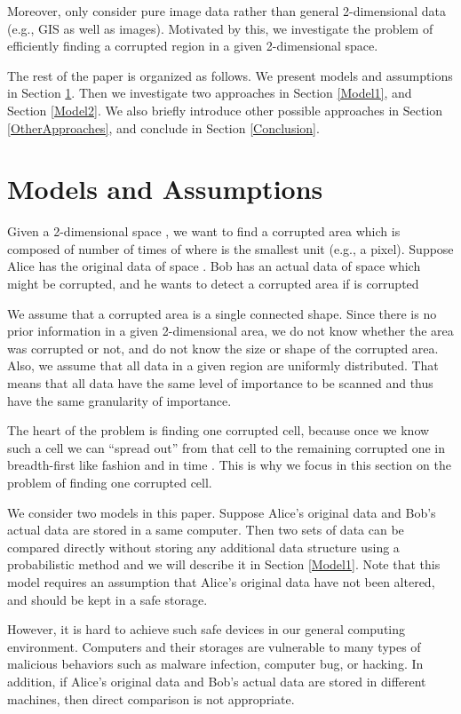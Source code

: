 \documentclass{llncs}
\begin{document}
Moreover, \cite{ZaMu07} only consider pure image data 
rather than general 2-dimensional data (e.g., GIS as well as images). 
Motivated by this, we investigate the problem of efficiently finding a corrupted region
in a given 2-dimensional space.

The rest of the paper is organized as follows. 
We present models and assumptions in Section \ref{ModelsAndAssumptions}.
Then we investigate two approaches in Section \ref{Model1}, 
and Section \ref{Model2}.
We also briefly introduce other possible approaches in Section \ref{OtherApproaches},
and conclude in Section \ref{Conclusion}.

\section{Models and Assumptions}
\label{ModelsAndAssumptions}
Given a 2-dimensional space , we want to find a corrupted area 
which is composed of  number of times of  where  is the smallest unit (e.g., a pixel).
Suppose Alice has the original data of space .
Bob has an actual data of space  which might be corrupted,
and he wants to detect a corrupted area  if  is corrupted 

We assume that a corrupted area is a single connected shape.
Since there is no prior information in a given 2-dimensional area,
we do not know whether the area was corrupted or not, and   
do not know the size or shape of the corrupted area.
Also, we assume that all data in a given region are uniformly distributed.
That means that all data have the same level of importance to be scanned 
and thus have the same granularity of importance.

The heart of the problem
is finding one corrupted cell, because once we
know such a cell we can ``spread out'' from that cell 
to the remaining corrupted one in breadth-first like fashion
and in time .
This is why we focus in this section on the problem of
finding one corrupted cell.

We consider two models in this paper. 
Suppose Alice's original data and Bob's actual data are stored in a same computer.
Then two sets of data can be compared directly without storing any additional data structure
using a probabilistic method and we will describe it in Section \ref{Model1}.
Note that this model requires an assumption that Alice's original data have not been altered, 
and should be kept in a safe storage.

However, it is hard to achieve such safe devices in our general computing environment.
Computers and their storages are vulnerable to many types of malicious behaviors
such as malware infection, computer bug, or hacking.    
In addition, if Alice's original data and Bob's actual data are stored in different machines, 
then direct comparison is not appropriate. 
\end{document}
